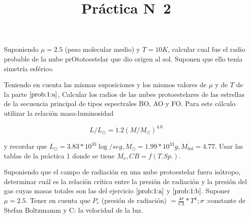 \documentclass[12pt,a4paper]{practice}
\begin{document}
    \title{Práctica N\textdegree\ 2}
    \maketitle
     \begin{problem}\label{prob:1}

        \begin{ppart}\label{prob:1:a}
        Suponiendo $\mu = 2.5$ (peso molecular medio) y $T = 10 K$,
        calcular cual fue el radio probable de la nube prOtotoestelar que dio origen al sol. Suponen que ello tenía simetría esférico.
        \end{ppart}

        \begin{ppart}\label{prob:1:b}
        Teniendo en cuenta las mismas suposiciones y los mismos valores de $\mu$ y de $T$ de la parte $\ref{prob:1:a}$, Calcular los radios de las nubes protoestelares de las estrellas de la secuencia principal de tipos espectrales BO, AO y FO. Para este cálculo utilizar la relación masa-luminosidad

        $$
            L/L_{\odot} = 1.2(M/M_{\odot})^{4.0}
        $$

        y recordar que $L_{\odot} = 3.83 * 10^{33} \log /seg, M_{\odot} = 1.99*10^{33} g, M_{bol} = 4.77$. Usar las tablas de la práctica 1 donde se tiene $M_{v},CB=f(T.Sp.)$.
        \end{ppart}
    \end{problem}

    \begin{problem}\label{prob:2}
    Suponiendo que el campo de radiación en una nube protoestelar fuera isótropo, determinar cuál es la relación crítica entre la presión de radiación y la presión del gas cuyas masas totales son las del ejercicio $\ref{prob:1:a}$ y $\ref{prob:1:b}$. Suponer $\mu =2.5$. Tener en cuenta que $P_{r}$ (presión de radiación) $ = \frac{4\sigma}{C3}*T^{4}; \sigma$ :constante de Stefan Boltzmamm y C: la velocidad de la luz.
    \end{problem}
\end{document}
